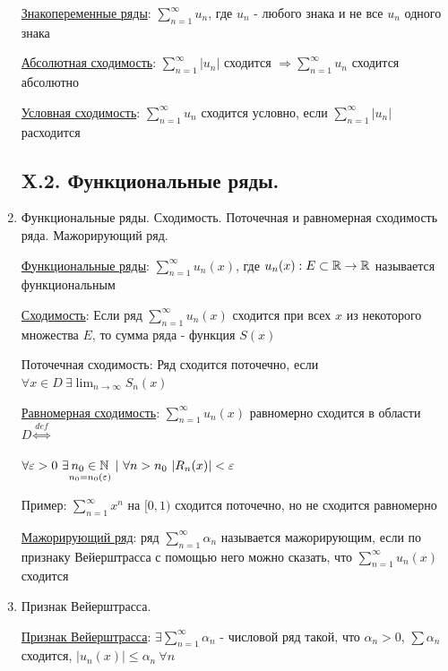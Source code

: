 \documentclass[12pt]{article}
\begin{document}
\begin{enumerate}
    \hyperlink{changingsignseries}{Знакопеременные ряды}: $\sum_{n = 1}^\infty u_n$, где $u_n$ - любого знака и не все $u_n$ одного знака

    \hyperlink{absoluteconvergence}{Абсолютная сходимость}: $\sum_{n = 1}^\infty |u_n|$ сходится $\Longrightarrow \sum_{n = 1}^\infty u_n$ сходится абсолютно

    \hyperlink{conditionalconvergence}{Условная сходимость}: $\sum_{n = 1}^\infty u_n$ сходится условно, если $\sum_{n = 1}^\infty |u_n|$ расходится

\subsection{X.2. Функциональные ряды.}

    \item Функциональные ряды. Сходимость. Поточечная и равномерная сходимость ряда.
    Мажорирующий ряд.

    \hyperlink{functionalseries}{Функциональные ряды}: $\sum_{n = 1}^\infty u_n(x)$, где $u_n(x) : E \subset \mathbb{R} \to \mathbb{R}$ называется функциональным

    \hyperlink{functionalseriesconvergence}{Сходимость}: Если ряд $\sum_{n = 1}^\infty u_n(x)$ сходится при всех $x$ из некоторого множества $E$, то сумма ряда -
    функция $S(x)$

    Поточечная сходимость: Ряд сходится поточечно, если $\forall x \in D \ \exists \lim_{n \to \infty} S_n(x)$

    \hyperlink{uniformconvergence}{Равномерная сходимость}:  $\sum_{n = 1}^\infty u_n(x)$ равномерно сходится в области $D \overset{def}{\Longleftrightarrow}$

    $\forall \varepsilon > 0 \ \exists \underset{n_0 = n_0(\varepsilon)}{n_0 \in \mathbb{N}} \ | \ \forall n > n_0 \ |R_n(x)| < \varepsilon$

    Пример: $\sum_{n = 1}^\infty x^n$ на $[0,1)$ сходится поточечно, но не сходится равномерно

    \hyperlink{majorseries}{Мажорирующий ряд}: ряд $\sum_{n = 1}^\infty \alpha_n$ называется мажорирующим, если по 
    признаку Вейерштрасса с помощью него можно сказать, что $\sum_{n = 1}^\infty u_n(x)$ сходится

    \item Признак Вейерштрасса.

    \hyperlink{weierstrassign}{Признак Вейерштрасса}: $\exists \sum_{n = 1}^\infty \alpha_n$ - числовой ряд такой, что $\alpha_n > 0$, $\sum \alpha_n$ сходится,
    $|u_n(x)| \leq \alpha_n \ \forall n$


\end{enumerate}
\end{document}
